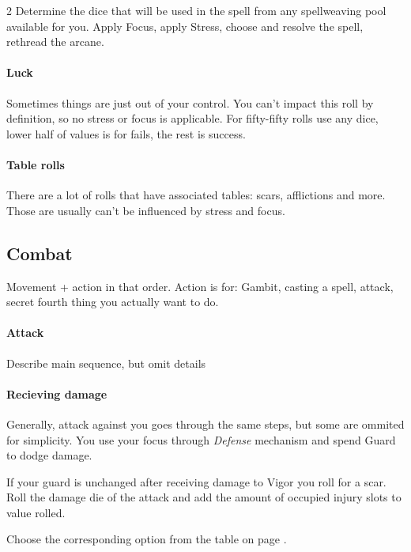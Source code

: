 \begin{multicols*}{2}
Determine the dice that will be used in the spell from any spellweaving pool available for you. Apply Focus, 
apply Stress, choose and resolve the spell, rethread the arcane.

\paragraph{Luck}

Sometimes things are just out of your control. You can't impact this roll by definition, so no stress or focus is applicable.
For fifty-fifty rolls use any dice, lower half of values is for fails, the rest is success.

\paragraph{Table rolls}

There are a lot of rolls that have associated tables: scars, afflictions and more. 
Those are usually can't be influenced by stress and focus. 

\newcolumn

\subsection*{Combat}

Movement + action in that order. 
Action is for: Gambit, casting a spell, attack, secret fourth thing you actually want to do.

\paragraph{Attack}

Describe main sequence, but omit details

\paragraph{Recieving damage}

Generally, attack against you goes through the same steps, but some are ommited for simplicity. 
You use your focus through \emph{Defense} mechanism and spend Guard to dodge damage. 

If your guard is unchanged after receiving damage to Vigor you roll for a scar. 
Roll the damage die of the attack and add the amount of occupied injury slots to value rolled. 

Choose the corresponding option from the table on page \pageref*{sec:injuries}.


\end{multicols*}
